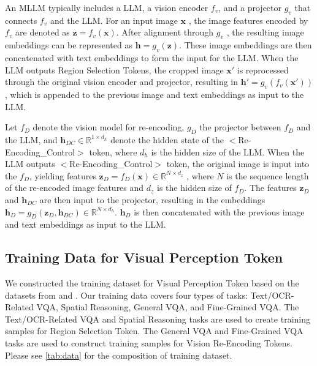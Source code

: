 An MLLM typically includes a LLM, a vision encoder  $f_v$, and a projector  $g_v$  that connects $f_v$ and the LLM. For an input image  $\bm{x}$ , the image features encoded by  $f_v$  are denoted as  $\bm{z} = f_v(\bm{x})$. After alignment through  $g_v$ , the resulting image embeddings can be represented as  $\bm{h} = g_v(\bm{z})$. These image embeddings are then concatenated with text embeddings to form the input for the LLM.
When the LLM outputs Region Selection Tokens, the cropped image  $\bm{x}'$  is reprocessed through the original vision encoder and projector, resulting in  $\bm{h}' = g_v(f_v(\bm{x}'))$, which is appended to the previous image and text embeddings as input to the LLM.



Let  $f_D$  denote the vision model for re-encoding,  $g_D$  the projector between  $f_D$ and the LLM, and  $\bm{h}_{DC} \in \mathbb{R}^{1 \times d_h}$  denote the hidden state of the $<$Re-Encoding\_Control$>$ token, where  $d_h$  is the hidden size of the LLM. When the LLM outputs $<$Re-Encoding\_Control$>$ token, the original image is input  into the $f_D$, yielding features  $\bm{z}_D = f_D(\bm{x}) \in \mathbb{R}^{N \times d_z}$ , where  $N$  is the sequence length of the re-encoded image features and  $d_z$  is the hidden size of $f_D$. The features  $\bm{z}_D$  and  $\bm{h}_{DC}$  are then input to the projector, resulting in the embeddings  $\bm{h}_D = g_D(\bm{z}_D, \bm{h}_{DC}) \in \mathbb{R}^{N \times d_h}$. $\bm{h}_D$ is then concatenated with the previous image and text embeddings as input to the LLM.

\subsection{Training Data for Visual Perception Token}\label{sec:data}
We constructed the training dataset for Visual Perception Token based on the datasets from \cite{llava15} and \cite{shao2024visual}. Our training data covers four types of tasks: Text/OCR-Related VQA, Spatial Reasoning, General VQA, and Fine-Grained VQA. The Text/OCR-Related VQA and Spatial Reasoning tasks are used to create training samples for Region Selection Token. The General VQA and Fine-Grained VQA tasks are used to construct training samples for Vision Re-Encoding Tokens. Please see \cref{tab:data} for the composition of training dataset.

